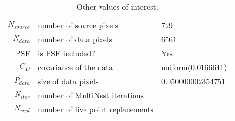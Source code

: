 \begin{table*}[!htb]\caption{Other values of interest.}\begin{center}\begin{tabular}{ r l l }\hline $N_{source}$ & number of source pixels           & 729 \\ 
 $N_{data}$   & number of data pixels             & 6561 \\ 
 PSF & is PSF included?                          & Yes \\
 $C_D$        & covariance of the data            & uniform(0.0166641) \\ 
 $P_{data}$   & size of data pixels               & 0.050000002354751 \\ 
 $N_{iter}$   & number of MultiNest iterations    &  \\ 
 $N_{repl}$   & number of live point replacements &  \\ 
\hline\end{tabular}\end{center}\label{tab:3}\end{table*}
